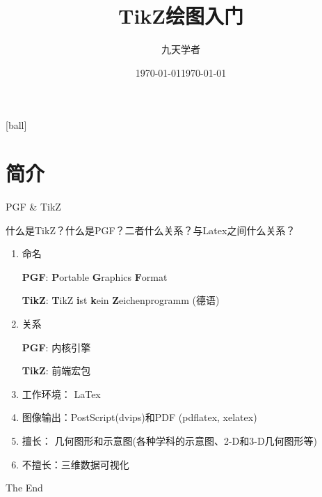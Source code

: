 \documentclass[xcolor={dvipsnames},aspectratio=169]{beamer}
\title[TikZ入门]{TikZ绘图入门} %
\author{九天学者} %
\institute[募格学术] %
{
\medskip
}
\date{\today} %
\begin{document}
\date[]{\today}

[ball]

\begin{frame}
\titlepage %
\centering
% 
\end{frame}



\section{简介} 

\begin{frame}{PGF \& TikZ}

什么是TikZ？什么是PGF？二者什么关系？与Latex之间什么关系？
    \begin{enumerate}
        \item 命名
        
        \textbf{PGF}: \textbf{P}ortable \textbf{G}raphics \textbf{F}ormat
        
        \textbf{TikZ}: \textbf{T}ikZ \textbf{i}st \textbf{k}ein \textbf{Z}eichenprogramm (德语)
        
        \item 关系
        
        \textbf{PGF}: 内核引擎
        
        \textbf{TikZ}: 前端宏包
        
        \item 工作环境： LaTex
        
        \item 图像输出：PostScript(dvips)和PDF (pdflatex, xelatex)
        
        \item 擅长： 几何图形和示意图(各种学科的示意图、2-D和3-D几何图形等)
        \item 不擅长：三维数据可视化
    \end{enumerate}
\end{frame}


\begin{frame}
\Huge{\centerline{The End}}
\end{frame}

\end{document}
